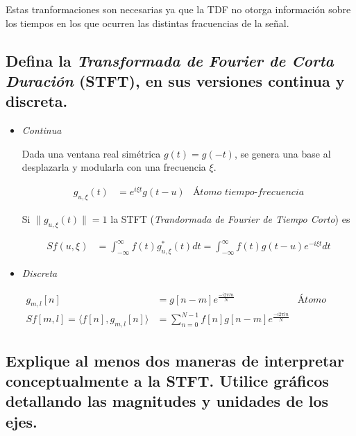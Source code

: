 \documentclass[a4paper,10pt,spanish,oneside]{article}
\begin{document}
Estas tranformaciones son necesarias ya que la TDF no otorga información sobre los tiempos en los que ocurren las distintas fracuencias de la señal.

\subsection{Defina la \textit{Transformada de Fourier de Corta Duración} (STFT), en sus versiones continua y discreta.}

\begin{itemize}
\item \textit{Continua}

Dada una ventana real simétrica $g(t)=g(-t)$, se genera una base al desplazarla y modularla con una frecuencia $\xi$.

\begin{align*}
g_{u,\xi}(t) &= e^{i\xi t}g(t-u) & \textit{Átomo tiempo-frecuencia}
\end{align*}

Si $\|g_{u,\xi}(t)\|=1$ la STFT (\textit{Trandormada de Fourier de Tiempo Corto}) es

\begin{align*}
Sf(u,\xi) &= \int_{-\infty}^{\infty}f(t)g_{u,\xi}^{*}(t)dt
=\int_{-\infty}^{\infty}f(t)g(t-u)e^{-i\xi t}dt
\end{align*}

\item \textit{Discreta}

\begin{align*}
g_{m,l}[n] &= g[n-m]e^{\frac{-i2\pi ln}{N}} & \textit{Átomo tiempo-frecuencia} \\
Sf[m,l]=\langle f[n],g_{m,l}[n]\rangle &= \sum_{n=0}^{N-1}f[n]g[n-m]e^{\frac{-i2\pi ln}{N}}
\end{align*}

\end{itemize}

\subsection{Explique al menos dos maneras de interpretar conceptualmente a la STFT. Utilice gráficos detallando las magnitudes y unidades de los ejes.}
\end{document}
